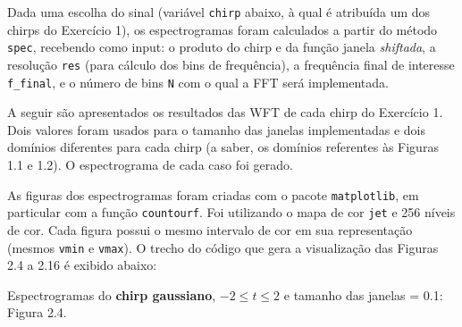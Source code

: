 Dada uma escolha do sinal (variável \texttt{chirp} abaixo, à qual é atribuída um dos chirps do Exercício 1), os espectrogramas foram calculados a partir do método \texttt{spec}, recebendo como input: o produto do chirp e da função janela \textit{shiftada}, a resolução \texttt{res} (para cálculo dos bins de frequência), a frequência final de interesse \texttt{f\_final}, e o número de bins \texttt{N} com o qual a FFT será implementada.



A seguir são apresentados os resultados das WFT de cada chirp do Exercício 1. Dois valores foram usados para o tamanho das janelas implementadas e dois domínios diferentes para cada chirp (a saber, os domínios referentes às Figuras 1.1 e 1.2). O espectrograma de cada caso foi gerado.

As figuras dos espectrogramas foram criadas com o pacote \texttt{matplotlib}, em particular com a função \texttt{countourf}. Foi utilizando o mapa de cor \texttt{jet} e 256 níveis de cor. Cada figura possui o mesmo intervalo de cor em sua representação (mesmos \texttt{vmin} e \texttt{vmax}). O trecho do código que gera a visualização das Figuras 2.4 a 2.16 é exibido abaixo:




Espectrogramas do \textbf{chirp gaussiano}, $-2 \leq t \leq 2$ e tamanho das janelas = 0.1: Figura 2.4.

